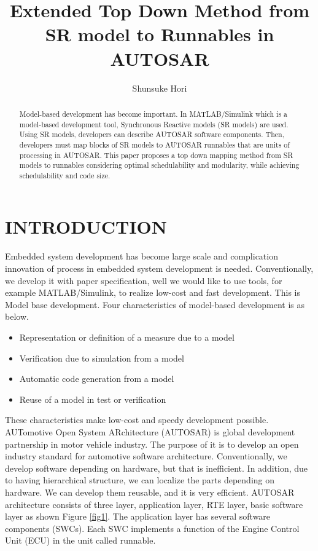 \documentclass[conference,compsoc]{IEEEtran}
\title{Extended Top Down Method from SR model to Runnables in AUTOSAR}
\author{Shunsuke Hori}
\begin{document}
\maketitle

\begin{abstract}
 Model-based development has become important.
In MATLAB/Simulink which is a model-based development tool, Synchronous Reactive models (SR models) are used.
Using SR models, developers can describe AUTOSAR software components.
Then, developers must map blocks of SR models to AUTOSAR runnables that are units of processing in AUTOSAR.
This paper proposes a top down mapping method from SR models to runnables considering optimal schedulability and modularity, while achieving schedulability and code size.
\end{abstract}
	\section{INTRODUCTION}
 Embedded system development has become large scale and complication innovation of process in embedded system development is needed.
Conventionally, we develop it with paper specification, well we would like to use tools, for example MATLAB/Simulink, to realize low-cost and fast development.
This is Model base development.
Four characteristics of model-based development is as below.
	\begin{itemize}
		\item Representation or definition of a measure due to a model
		\item Verification due to simulation from a model
		\item Automatic code generation from a model
		\item Reuse of a model in test or verification
	\end{itemize} 
These characteristics make low-cost and speedy development possible.
 AUTomotive Open System ARchitecture (AUTOSAR) is global development partnership in motor vehicle industry.
The purpose of it is to develop an open industry standard for automotive software architecture.
Conventionally, we develop software depending on hardware, but that is inefficient.
In addition, due to having hierarchical structure, we can localize the parts depending on hardware.
We can develop them reusable, and it is very efficient. 
AUTOSAR architecture consists of three layer, application layer, RTE layer, basic software layer as shown Figure \ref{fig1}.
 The application layer has several software components (SWCs).
Each SWC implements a function of the Engine Control Unit (ECU) in the unit called runnable.
\end{document}
